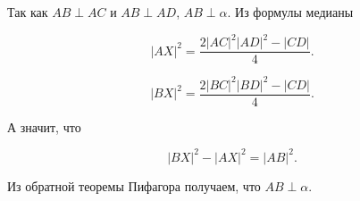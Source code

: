 Так как $AB\perp AC$ и $AB\perp AD$, $AB\perp\alpha$. Из формулы медианы

\begin{equation}
|AX|^2=\frac{2|AC|^2|AD|^2-|CD|}{4}.
\end{equation}

\begin{equation}
|BX|^2=\frac{2|BC|^2|BD|^2-|CD|}{4}.
\end{equation}

А значит, что

\begin{equation}
|BX|^2-|AX|^2 = |AB|^2.
\end{equation}

Из обратной теоремы Пифагора получаем, что $AB\perp \alpha$.
